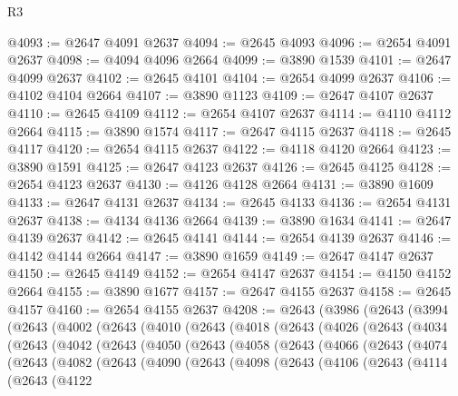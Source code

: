 \begin{lexlean}{R3}
\begin{coremodule}
@4093 := @2647 @4091 @2637
@4094 := @2645 @4093
@4096 := @2654 @4091 @2637
@4098 := @4094 @4096 @2664
@4099 := @3890 @1539
@4101 := @2647 @4099 @2637
@4102 := @2645 @4101
@4104 := @2654 @4099 @2637
@4106 := @4102 @4104 @2664
@4107 := @3890 @1123
@4109 := @2647 @4107 @2637
@4110 := @2645 @4109
@4112 := @2654 @4107 @2637
@4114 := @4110 @4112 @2664
@4115 := @3890 @1574
@4117 := @2647 @4115 @2637
@4118 := @2645 @4117
@4120 := @2654 @4115 @2637
@4122 := @4118 @4120 @2664
@4123 := @3890 @1591
@4125 := @2647 @4123 @2637
@4126 := @2645 @4125
@4128 := @2654 @4123 @2637
@4130 := @4126 @4128 @2664
@4131 := @3890 @1609
@4133 := @2647 @4131 @2637
@4134 := @2645 @4133
@4136 := @2654 @4131 @2637
@4138 := @4134 @4136 @2664
@4139 := @3890 @1634
@4141 := @2647 @4139 @2637
@4142 := @2645 @4141
@4144 := @2654 @4139 @2637
@4146 := @4142 @4144 @2664
@4147 := @3890 @1659
@4149 := @2647 @4147 @2637
@4150 := @2645 @4149
@4152 := @2654 @4147 @2637
@4154 := @4150 @4152 @2664
@4155 := @3890 @1677
@4157 := @2647 @4155 @2637
@4158 := @2645 @4157
@4160 := @2654 @4155 @2637
@4208 := @2643
    (@3986
      (@2643
        (@3994
          (@2643
            (@4002
              (@2643
                (@4010
                  (@2643
                    (@4018
                      (@2643
                        (@4026
                          (@2643
                            (@4034
                              (@2643
                                (@4042
                                  (@2643
                                    (@4050
                                      (@2643
                                        (@4058
                                          (@2643
                                            (@4066
                                              (@2643
                                                (@4074
                                                  (@2643
                                                    (@4082
                                                      (@2643
                                                        (@4090
                                                          (@2643
                                                            (@4098
                                                              (@2643
                                                                (@4106
                                                                  (@2643
                                                                    (@4114
                                                                      (@2643
                                                                        (@4122

\end{coremodule}
\end{lexlean}
